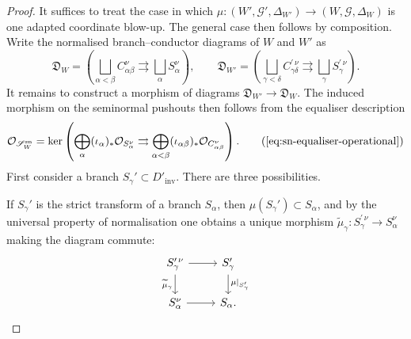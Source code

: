 \documentclass[11pt]{amsart}
\numberwithin{equation}{section}
\theoremstyle{plain}
\theoremstyle{definition}
\newcommand{\sn}{\mathrm{sn}}
\newcommand{\inv}{\mathrm{inv}}
\begin{document}
\begin{proof}
It suffices to treat the case in which
$
\mu:(W',\mathcal G',\Delta_{W'})\longrightarrow
(W,\mathcal G,\Delta_W)
$
is one adapted coordinate blow-up. The general case then follows by composition.
Write the normalised branch--conductor diagrams of \(W\) and \(W'\) as
\[
\mathfrak D_W=
\left(
\bigsqcup_{\alpha<\beta} C_{\alpha\beta}^{\nu}
\rightrightarrows
\bigsqcup_{\alpha} S_\alpha^{\nu}
\right),
\qquad
\mathfrak D_{W'}=
\left(
\bigsqcup_{\gamma<\delta} C_{\gamma\delta}^{\prime\,\nu}
\rightrightarrows
\bigsqcup_{\gamma} S_\gamma^{\prime\,\nu}
\right).
\]
It remains to construct a morphism of diagrams
$
\mathfrak D_{W'}\longrightarrow \mathfrak D_W.
$
The induced morphism on the seminormal pushouts then follows from the
equaliser description
\[
\mathcal O_{\mathscr S_W^{\sn}}
=
\ker\left(
\bigoplus_\alpha (\iota_\alpha)_*\mathcal O_{S_\alpha^\nu}
\rightrightarrows
\bigoplus_{\alpha<\beta}(\iota_{\alpha\beta})_*
\mathcal O_{C_{\alpha\beta}^\nu}
\right).
\tag{\ref{eq:sn-equaliser-operational}}
\]
First consider a branch \(S_\gamma'\subset D'_{\inv}\). There are three possibilities.

If \(S_\gamma'\) is the strict transform of a branch \(S_\alpha\), then
\(\mu(S_\gamma')\subset S_\alpha\), and by the universal property of
normalisation one obtains a unique morphism
$
\widetilde\mu_\gamma:S_\gamma^{\prime\,\nu}\longrightarrow S_\alpha^\nu
$
making the diagram commute:
\[
\begin{tikzcd}
S_\gamma^{\prime\,\nu} \arrow[r] \arrow[d,"\widetilde\mu_\gamma"']&
S_\gamma' \arrow[d,"\mu|_{S_\gamma'}"]\\
S_\alpha^\nu \arrow[r]& S_\alpha.
\end{tikzcd}
\]


\end{proof}
\end{document}
